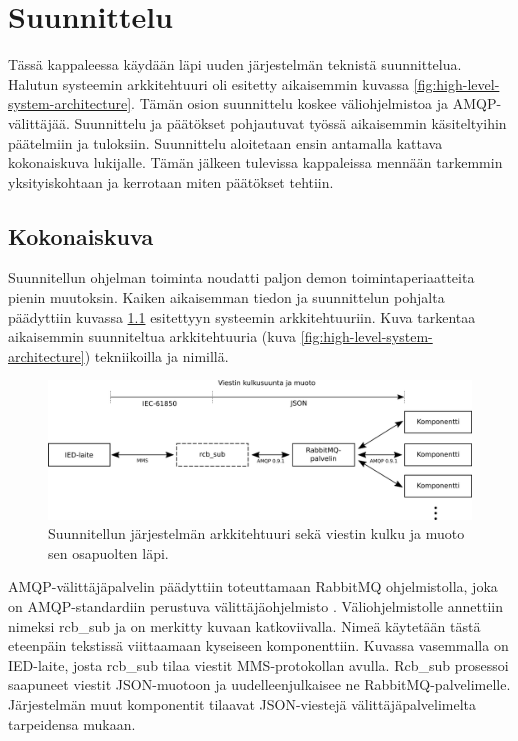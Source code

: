 \chapter{Suunnittelu}
\label{ch:suunnittelu}
Tässä kappaleessa käydään läpi uuden järjestelmän teknistä suunnittelua. Halutun systeemin arkkitehtuuri oli esitetty aikaisemmin kuvassa \ref{fig:high-level-system-architecture}. Tämän osion suunnittelu koskee väliohjelmistoa ja AMQP-välittäjää. Suunnittelu ja päätökset pohjautuvat työssä aikaisemmin käsiteltyihin päätelmiin ja tuloksiin. Suunnittelu aloitetaan ensin antamalla kattava kokonaiskuva lukijalle. Tämän jälkeen tulevissa kappaleissa mennään tarkemmin yksityiskohtaan ja kerrotaan miten päätökset tehtiin.


\section{Kokonaiskuva}
Suunnitellun ohjelman toiminta noudatti paljon demon toimintaperiaatteita pienin muutoksin. Kaiken aikaisemman tiedon ja suunnittelun pohjalta päädyttiin kuvassa \ref{fig:planned-system-architecture} esitettyyn systeemin arkkitehtuuriin. Kuva tarkentaa aikaisemmin suunniteltua arkkitehtuuria (kuva \ref{fig:high-level-system-architecture}) tekniikoilla ja nimillä.

\begin{figure}[ht!]
	\includegraphics[width=1\textwidth]{pictures/planned-system-architecture.png}
	\caption{Suunnitellun järjestelmän arkkitehtuuri sekä viestin kulku ja muoto sen osapuolten läpi.}
	\label{fig:planned-system-architecture}
\end{figure}

AMQP-välittäjäpalvelin päädyttiin toteuttamaan RabbitMQ ohjelmistolla, joka on AMQP-stan\-dar\-diin perustuva välittäjäohjelmisto \cite{rabbitmq-homepage}. Väliohjelmistolle annettiin nimeksi rcb\_sub ja on merkitty kuvaan katkoviivalla. Nimeä käytetään tästä eteenpäin tekstissä viittaamaan kyseiseen komponenttiin. Kuvassa vasemmalla on IED-laite, josta rcb\_sub tilaa viestit MMS-protokollan avulla. Rcb\_sub prosessoi saapuneet viestit JSON-muotoon ja uudelleenjulkaisee ne RabbitMQ-palvelimelle. Järjestelmän muut komponentit tilaavat JSON-viestejä välittäjäpalvelimelta tarpeidensa mukaan.


